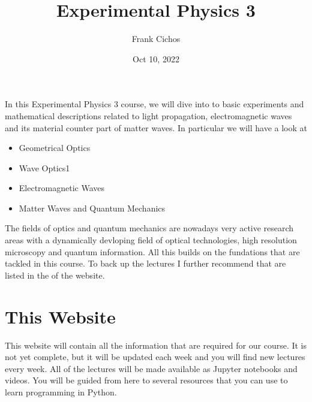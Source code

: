 \documentclass[letterpaper,10pt,english]{sphinxmanual}
\title{Experimental Physics 3}
\date{Oct 10, 2022}
\author{Frank Cichos}
\let\sphinxpxdimen\pdfpxdimen\else\newdimen\sphinxpxdimen
\begin{document}
\pagestyle{empty}
\sphinxmaketitle
\pagestyle{plain}
\sphinxtableofcontents
\pagestyle{normal}
\label{\detokenize{index::doc}}
\begin{figure}[htbp]
\centering

\noindent\sphinxincludegraphics[width=8711\sphinxpxdimen,height=1893\sphinxpxdimen]{{CompSoft_banner}.png}
\end{figure}



\sphinxAtStartPar
In this Experimental Physics 3 course, we will dive into to basic experiments and mathematical descriptions related to light propagation, electromagnetic waves and its material counter part of matter waves. In particular we will have a look at
\begin{itemize}
\item {} 
\sphinxAtStartPar
Geometrical Optics

\item {} 
\sphinxAtStartPar
Wave Optics1

\item {} 
\sphinxAtStartPar
Electromagnetic Waves

\item {} 
\sphinxAtStartPar
Matter Waves and Quantum Mechanics

\end{itemize}

\sphinxAtStartPar
The fields of optics and quantum mechanics are nowadays very active research areas with a dynamically devloping field of optical technologies, high resolution microscopy and quantum information. All this builds on the fundations that are tackled in this course. To back up the lectures I further recommend  that are listed in the  of the website.


\chapter{This Website}
\label{\detokenize{course-info/website:this-website}}\label{\detokenize{course-info/website::doc}}
\sphinxAtStartPar
This website will contain all the information that are required for our  course. It is not yet complete, but it will be updated each week and you will find new lectures every week.
All of the lectures will be made available as Jupyter notebooks and videos.
You will be guided from here to several resources that you can use to learn programming in Python.
\end{document}
